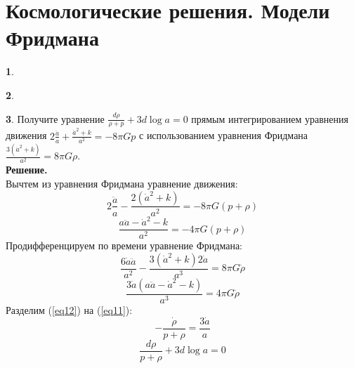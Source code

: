 \documentclass[12pt]{article}
\theoremstyle{definition}
\newtheorem{zad}{}[section]
\begin{document}
\section{Космологические решения. Модели Фридмана}
\begin{zad}

\end{zad}
\begin{zad}

\end{zad}
\begin{zad}
Получите уравнение $\frac{d\rho}{\rho+p}+3d\log a=0$ прямым интегрированием уравнения движения $2\frac{\ddot{a}}{a}+\frac{\dot{a}^2+k}{a^2}=-8\pi Gp$ с использованием уравнения Фридмана $\frac{3(\dot{a}^2+k)}{a^2}=8\pi G\rho$.\\
\textbf{Решение.}\\
Вычтем из уравнения Фридмана уравнение движения:
\begin{equation}
    2\frac{\ddot{a}}{a}-\frac{2(\dot{a}^2+k)}{a^2}=-8\pi G(p+\rho)
\end{equation}
\begin{equation}\label{eq11}
    \frac{a\ddot{a}-\dot{a}^2-k}{a^2}=-4\pi G(p+\rho)
\end{equation}
Продифференцируем по времени уравнение Фридмана:
\begin{equation}
    \frac{6\dot{a}\ddot{a}}{a^2}-\frac{3(\dot{a}^2+k)2\dot{a}}{a^3}=8\pi G\dot{\rho}
\end{equation}
\begin{equation}\label{eq12}
    \frac{3\dot{a}(a\ddot{a}-\dot{a}^2-k)}{a^3}=4\pi G\dot{\rho}
\end{equation}
Разделим (\ref{eq12}) на (\ref{eq11}):
\begin{equation}
    -\frac{\dot{\rho}}{p+\rho}=\frac{3\dot{a}}{a}
\end{equation}
\begin{equation}
    \boxed{\frac{d\rho}{p+\rho}+3d\log a=0}
\end{equation}
\end{zad}
\end{document}
